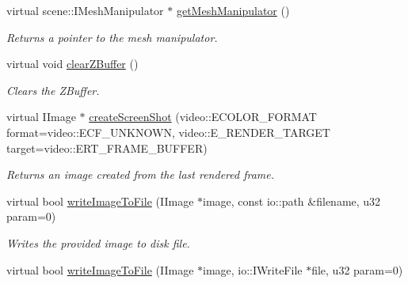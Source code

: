 \begin{DoxyCompactItemize}
\item 
\hypertarget{classirr_1_1video_1_1_c_null_driver_a846213b871eef7cff68c3d1e62f430f2}{virtual scene\-::\-I\-Mesh\-Manipulator $\ast$ \hyperlink{classirr_1_1video_1_1_c_null_driver_a846213b871eef7cff68c3d1e62f430f2}{get\-Mesh\-Manipulator} ()}\label{classirr_1_1video_1_1_c_null_driver_a846213b871eef7cff68c3d1e62f430f2}

\begin{DoxyCompactList}\small\item\em Returns a pointer to the mesh manipulator. \end{DoxyCompactList}\item 
\hypertarget{classirr_1_1video_1_1_c_null_driver_a6cc425f2db0630ca8a60e1b42c3a13aa}{virtual void \hyperlink{classirr_1_1video_1_1_c_null_driver_a6cc425f2db0630ca8a60e1b42c3a13aa}{clear\-Z\-Buffer} ()}\label{classirr_1_1video_1_1_c_null_driver_a6cc425f2db0630ca8a60e1b42c3a13aa}

\begin{DoxyCompactList}\small\item\em Clears the Z\-Buffer. \end{DoxyCompactList}\item 
\hypertarget{classirr_1_1video_1_1_c_null_driver_abf486de522ac905996d4cc1dda649bff}{virtual I\-Image $\ast$ \hyperlink{classirr_1_1video_1_1_c_null_driver_abf486de522ac905996d4cc1dda649bff}{create\-Screen\-Shot} (video\-::\-E\-C\-O\-L\-O\-R\-\_\-\-F\-O\-R\-M\-A\-T format=video\-::\-E\-C\-F\-\_\-\-U\-N\-K\-N\-O\-W\-N, video\-::\-E\-\_\-\-R\-E\-N\-D\-E\-R\-\_\-\-T\-A\-R\-G\-E\-T target=video\-::\-E\-R\-T\-\_\-\-F\-R\-A\-M\-E\-\_\-\-B\-U\-F\-F\-E\-R)}\label{classirr_1_1video_1_1_c_null_driver_abf486de522ac905996d4cc1dda649bff}

\begin{DoxyCompactList}\small\item\em Returns an image created from the last rendered frame. \end{DoxyCompactList}\item 
\hypertarget{classirr_1_1video_1_1_c_null_driver_a1bb7af0b4378716978cc4bf9a0c3b787}{virtual bool \hyperlink{classirr_1_1video_1_1_c_null_driver_a1bb7af0b4378716978cc4bf9a0c3b787}{write\-Image\-To\-File} (I\-Image $\ast$image, const io\-::path \&filename, u32 param=0)}\label{classirr_1_1video_1_1_c_null_driver_a1bb7af0b4378716978cc4bf9a0c3b787}

\begin{DoxyCompactList}\small\item\em Writes the provided image to disk file. \end{DoxyCompactList}\item 
\hypertarget{classirr_1_1video_1_1_c_null_driver_a442a5c59a537a75586fc82695b8878e1}{virtual bool \hyperlink{classirr_1_1video_1_1_c_null_driver_a442a5c59a537a75586fc82695b8878e1}{write\-Image\-To\-File} (I\-Image $\ast$image, io\-::\-I\-Write\-File $\ast$file, u32 param=0)}\label{classirr_1_1video_1_1_c_null_driver_a442a5c59a537a75586fc82695b8878e1}


\end{DoxyCompactItemize}
